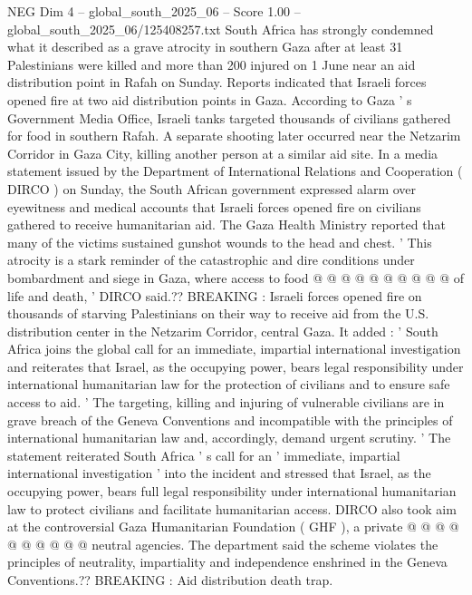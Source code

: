 \begin{textsample}{NEG Dim 4 – global\_south\_2025\_06 – Score 1.00 – global\_south\_2025\_06/125408257.txt}  \label{ex:f4_neg_107}
South Africa has strongly condemned what it described as a grave atrocity in southern Gaza after at least 31 Palestinians were killed and more than 200 injured on 1 June near an aid distribution point in Rafah on Sunday.
Reports indicated that Israeli forces opened fire at two aid distribution points in Gaza.
According to Gaza ' s Government Media Office, Israeli tanks targeted thousands of civilians gathered for food in southern Rafah.
A separate shooting later occurred near the Netzarim Corridor in Gaza City, killing another person at a similar aid site.
In a media statement issued by the Department of International Relations and Cooperation ( DIRCO ) on Sunday, the South African government expressed alarm over eyewitness and medical accounts that Israeli forces opened fire on civilians gathered to receive humanitarian aid.
The Gaza Health Ministry reported that many of the victims sustained gunshot wounds to the head and chest. ' This atrocity is a stark reminder of the catastrophic and dire conditions under bombardment and siege in Gaza, where access to food @ @ @ @ @ @ @ @ @ @ of life and death, ' DIRCO said.??
BREAKING : Israeli forces opened fire on thousands of starving Palestinians on their way to receive aid from the U.S. distribution center in the Netzarim Corridor, central Gaza.
It added : ' South Africa joins the global call for an immediate, impartial international investigation and reiterates that Israel, as the occupying power, bears legal responsibility under international humanitarian law for the protection of civilians and to ensure safe access to aid. ' The targeting, killing and injuring of vulnerable civilians are in grave breach of the Geneva Conventions and incompatible with the principles of international humanitarian law and, accordingly, demand urgent scrutiny. ' The statement reiterated South Africa ' s call for an ' immediate, impartial international investigation ' into the incident and stressed that Israel, as the occupying power, bears full legal responsibility under international humanitarian law to protect civilians and facilitate humanitarian access.
DIRCO also took aim at the controversial Gaza Humanitarian Foundation ( GHF ), a private @ @ @ @ @ @ @ @ @ @ neutral agencies.
The department said the scheme violates the principles of neutrality, impartiality and independence enshrined in the Geneva Conventions.??
BREAKING : Aid distribution death trap.

\end{textsample}
